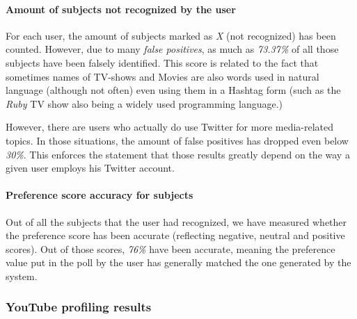 \paragraph{Amount of subjects not recognized by the user}
For each user, the amount of subjects marked as \textit{X} (not recognized) has been counted. However, due to many
\textit{false positives}, as much as \textit{73.37\%} of all those subjects have been falsely identified. This score is
related to the fact that sometimes names of TV-shows and Movies are also words used in natural language (although not
often) even using them in a Hashtag form (such as the \textit{Ruby} TV show also being a widely used programming language.)

However, there are users who actually do use Twitter for more media-related topics. In those situations, the amount of
false positives has dropped even below \textit{30\%}. This enforces the statement that those results greatly depend
on the way a given user employs his Twitter account.

\paragraph{Preference score accuracy for subjects}
Out of all the subjects that the user had recognized, we have measured whether the preference score has been accurate
(reflecting negative, neutral and positive scores). Out of those scores, \textit{76\%} have been accurate, meaning
the preference value put in the poll by the user has generally matched the one generated by the system.

\subsubsection{YouTube profiling results}